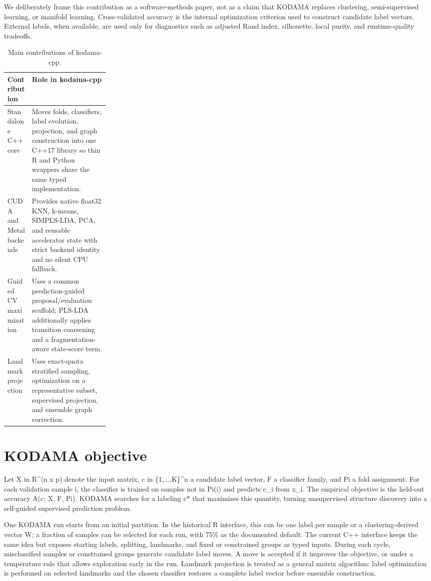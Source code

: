 \documentclass[twoside,11pt]{article}
\begin{document}
We deliberately frame this contribution as a software-methods paper, not as a claim that KODAMA replaces clustering, semi-supervised learning, or manifold learning. Cross-validated accuracy is the internal optimization criterion used to construct candidate label vectors. External labels, when available, are used only for diagnostics such as adjusted Rand index, silhouette, local purity, and runtime-quality tradeoffs.

\begin{table}[h]
\caption{Main contributions of kodama-cpp.}
\small
\begin{tabularx}{\linewidth}{p{0.24\linewidth}X}
\toprule
Contribution & Role in kodama-cpp \\
\midrule
Standalone C++ core & Moves folds, classifiers, label evolution, projection, and graph construction into one C++17 library so thin R and Python wrappers share the same typed implementation. \\
CUDA and Metal backends & Provides native float32 KNN, k-means, SIMPLS-LDA, PCA, and reusable accelerator state with strict backend identity and no silent CPU fallback. \\
Guided CV maximization & Uses a common prediction-guided proposal/evaluation scaffold; PLS-LDA additionally applies transition coarsening and a fragmentation-aware state-score term. \\
Landmark projection & Uses exact-quota stratified sampling, optimization on a representative subset, supervised projection, and ensemble graph correction. \\
\bottomrule
\end{tabularx}
\end{table}

\section{KODAMA objective}
Let X in R\textasciicircum{}(n x p) denote the input matrix, c in \{1,...,K\}\textasciicircum{}n a candidate label vector, F a classifier family, and Pi a fold assignment. For each validation sample i, the classifier is trained on samples not in Pi(i) and predicts c\_i from x\_i. The empirical objective is the held-out accuracy A(c; X, F, Pi). KODAMA searches for a labeling c* that maximizes this quantity, turning unsupervised structure discovery into a self-guided supervised prediction problem.

One KODAMA run starts from an initial partition. In the historical R interface, this can be one label per sample or a clustering-derived vector W; a fraction of samples can be selected for each run, with 75\% as the documented default. The current C++ interface keeps the same idea but exposes starting labels, splitting, landmarks, and fixed or constrained groups as typed inputs. During each cycle, misclassified samples or constrained groups generate candidate label moves. A move is accepted if it improves the objective, or under a temperature rule that allows exploration early in the run. Landmark projection is treated as a general matrix algorithm: label optimization is performed on selected landmarks and the chosen classifier restores a complete label vector before ensemble construction.
\end{document}
